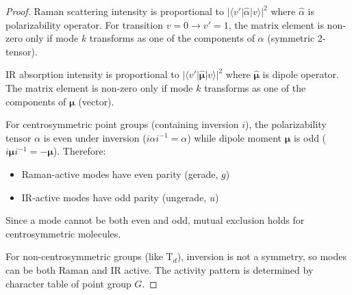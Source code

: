 \documentclass[twocolumn,10pt]{article}
\begin{document}
\begin{proof}
Raman scattering intensity is proportional to $|\langle v'| \hat{\alpha} |v \rangle|^2$ where $\hat{\alpha}$ is polarizability operator. For transition $v=0 \to v'=1$, the matrix element is non-zero only if mode $k$ transforms as one of the components of $\alpha$ (symmetric 2-tensor).

IR absorption intensity is proportional to $|\langle v'| \hat{\boldsymbol{\mu}} |v \rangle|^2$ where $\hat{\boldsymbol{\mu}}$ is dipole operator. The matrix element is non-zero only if mode $k$ transforms as one of the components of $\boldsymbol{\mu}$ (vector).

For centrosymmetric point groups (containing inversion $i$), the polarizability tensor $\alpha$ is even under inversion ($i\alpha i^{-1} = \alpha$) while dipole moment $\boldsymbol{\mu}$ is odd ($i\boldsymbol{\mu} i^{-1} = -\boldsymbol{\mu}$). Therefore:
\begin{itemize}
\item Raman-active modes have even parity (gerade, $g$)
\item IR-active modes have odd parity (ungerade, $u$)
\end{itemize}
Since a mode cannot be both even and odd, mutual exclusion holds for centrosymmetric molecules.

For non-centrosymmetric groups (like T$_d$), inversion is not a symmetry, so modes can be both Raman and IR active. The activity pattern is determined by character table of point group $G$.
\end{proof}
\end{document}
